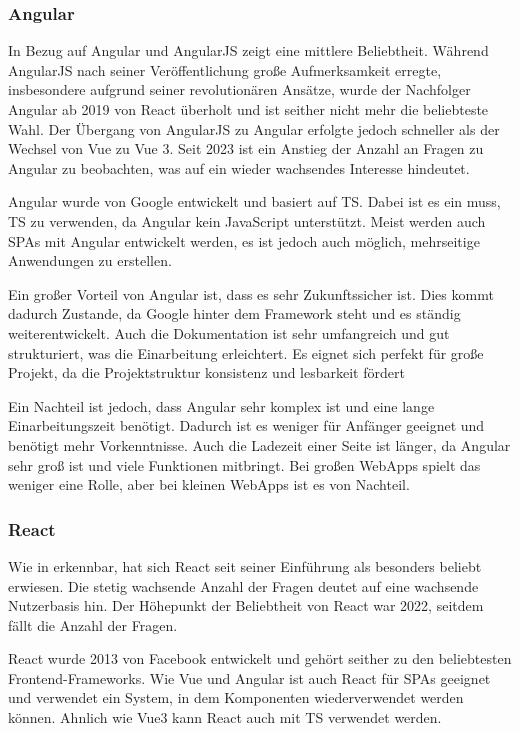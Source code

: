\documentclass[biblatex]{lni}
\begin{document}
\subsubsection{Angular}

In Bezug auf Angular und AngularJS zeigt  eine mittlere Beliebtheit.
Während AngularJS nach seiner Veröffentlichung große Aufmerksamkeit erregte,
insbesondere aufgrund seiner revolutionären Ansätze,
wurde der Nachfolger Angular ab 2019 von React überholt und ist seither nicht mehr die beliebteste Wahl.
Der Übergang von AngularJS zu Angular erfolgte jedoch schneller als der Wechsel von Vue zu Vue 3.
Seit 2023 ist ein Anstieg der Anzahl an Fragen zu Angular zu beobachten,
was auf ein wieder wachsendes Interesse hindeutet.

Angular wurde von Google entwickelt und basiert auf \ac{TS}. \cite{NG}
Dabei ist es ein muss, \ac{TS} zu verwenden, da Angular kein JavaScript unterstützt.
Meist werden auch \ac{SPA}s mit Angular entwickelt werden, es ist jedoch auch möglich, mehrseitige Anwendungen zu erstellen.

Ein großer Vorteil von Angular ist, dass es sehr Zukunftssicher ist. \cite{BStack}
Dies kommt dadurch Zustande, da Google hinter dem Framework steht und es ständig weiterentwickelt.
Auch die Dokumentation ist sehr umfangreich und gut strukturiert, was die Einarbeitung erleichtert. \cite{NG}
Es eignet sich perfekt für große Projekt, da die Projektstruktur konsistenz und lesbarkeit fördert

Ein Nachteil ist jedoch, dass Angular sehr komplex ist und eine lange Einarbeitungszeit benötigt. \cite{BStack}
Dadurch ist es weniger für Anfänger geeignet und benötigt mehr Vorkenntnisse.
Auch die Ladezeit einer Seite ist länger, da Angular sehr groß ist und viele Funktionen mitbringt.
Bei großen \ac{WebApp}s spielt das weniger eine Rolle, aber bei kleinen \ac{WebApp}s ist es von Nachteil.

\subsubsection{React}

Wie in  erkennbar, hat sich React seit seiner Einführung als besonders beliebt erwiesen.
Die stetig wachsende Anzahl der Fragen deutet auf eine wachsende Nutzerbasis hin.
Der Höhepunkt der Beliebtheit von React war 2022, seitdem fällt die Anzahl der Fragen.

React wurde 2013 von Facebook entwickelt und gehört seither zu den beliebtesten Frontend-Frameworks. \cite{BStack}
Wie Vue und Angular ist auch React für \ac{SPA}s geeignet und verwendet ein System, in dem Komponenten wiederverwendet werden können.
Ahnlich wie Vue3 kann React auch mit \ac{TS} verwendet werden.\cite{RCT}
\end{document}
